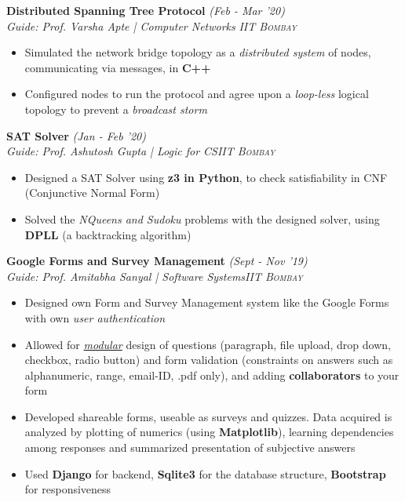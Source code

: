 \documentclass{article}
\begin{document}
\vspace{-5pt}
\textbf{Distributed Spanning Tree Protocol} \hfill{\sl \small (Feb - Mar '20)}\\{\it Guide: Prof. Varsha Apte | Computer Networks} \hfill{\sl \small \textsc{IIT Bombay}}\\
\vspace{-19pt}
\begin{itemize}[itemsep = -1 mm, leftmargin=*]
   \item Simulated the network bridge topology as a \textit{distributed system} of nodes, communicating via messages, in \textbf{C++}
    \item Configured nodes to run the protocol and agree upon a \textit{loop-less} logical topology to prevent a \textit{broadcast storm}
\end{itemize}
\vspace{-5pt}
\textbf{SAT Solver} \hfill{\sl \small (Jan - Feb '20)}\\{\it Guide: Prof. Ashutosh Gupta | Logic for CS}\hfill{\sl \small \textsc{IIT Bombay}}\\
\vspace{-19pt}
\begin{itemize}[itemsep = -1 mm, leftmargin=*]
   \item Designed a SAT Solver using \textbf{z3 in Python}, to check satisfiability in CNF (Conjunctive Normal Form)
    \item Solved the \textit{NQueens and Sudoku} problems with the designed solver, using \textbf{DPLL} (a backtracking algorithm)
\end{itemize}
\vspace{-5pt}
\textbf{Google Forms and Survey Management} \hfill{\sl \small (Sept - Nov '19)}\\
{\it Guide: Prof. Amitabha Sanyal | Software Systems}\hfill{\sl \small \textsc{IIT Bombay}}\\
\vspace{-19pt}
\begin{itemize}[itemsep = -1 mm, leftmargin=*]
    \item Designed own Form and Survey Management system like the Google Forms with own \textit{user authentication}
    \item Allowed for \textit{\underline{modular}} design of questions (paragraph, file upload, drop down, checkbox, radio button) and form validation (constraints on answers such as alphanumeric, range, email-ID, .pdf only), and adding \textbf{collaborators} to your form
    \item Developed shareable forms, useable as surveys and quizzes. Data acquired
    is analyzed by plotting of numerics (using \textbf{Matplotlib}), learning dependencies among responses and summarized presentation of subjective answers
    \item Used \textbf{Django} for backend, \textbf{Sqlite3} for the database structure, \textbf{Bootstrap} for responsiveness
\end{itemize}
\end{document}
